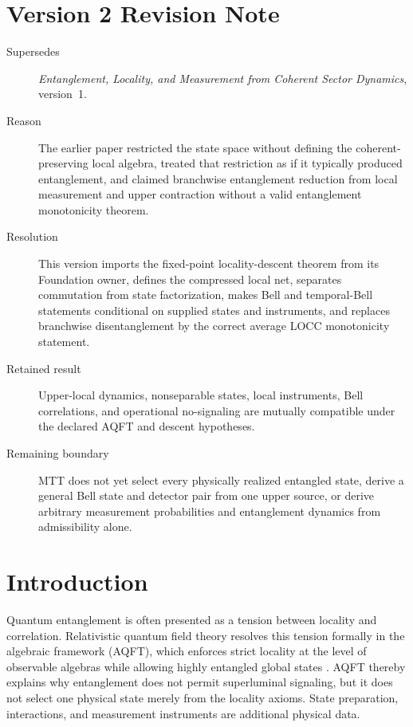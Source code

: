 \documentclass[11pt]{article}
\begin{document}
\section*{Version 2 Revision Note}
\begin{description}
\item[Supersedes] \emph{Entanglement, Locality, and Measurement from Coherent
Sector Dynamics}, version~1.
\item[Reason] The earlier paper restricted the state space without defining
the coherent-preserving local algebra, treated that restriction as if it
typically produced entanglement, and claimed branchwise entanglement reduction
from local measurement and upper contraction without a valid entanglement
monotonicity theorem.
\item[Resolution] This version imports the fixed-point locality-descent theorem
from its Foundation owner, defines the compressed local net, separates
commutation from state factorization, makes Bell and temporal-Bell statements
conditional on supplied states and instruments, and replaces branchwise
disentanglement by the correct average LOCC monotonicity statement.
\item[Retained result] Upper-local dynamics, nonseparable states, local
instruments, Bell correlations, and operational no-signaling are mutually
compatible under the declared AQFT and descent hypotheses.
\item[Remaining boundary] MTT does not yet select every physically realized
entangled state, derive a general Bell state and detector pair from one upper
source, or derive arbitrary measurement probabilities and entanglement
dynamics from admissibility alone.
\end{description}

\tableofcontents

\section{Introduction}

Quantum entanglement is often presented as a tension between locality and correlation.
Relativistic quantum field theory resolves this tension formally in the algebraic framework
(AQFT), which enforces strict locality at the level of observable algebras while allowing
highly entangled global states \cite{Haag1996,BFV2003,HollandsWald2001}.
AQFT thereby explains why entanglement does not permit superluminal signaling, but it does not
select one physical state merely from the locality axioms.  State preparation,
interactions, and measurement instruments are additional physical data.
\end{document}
